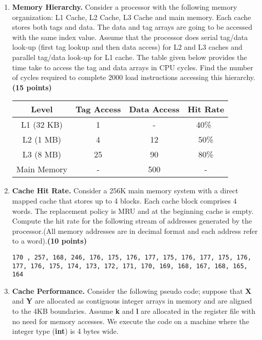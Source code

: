 \documentclass[a4paper, 11pt]{exam}
\begin{document}
\begin{enumerate}
\begin{enumerate}
\end{enumerate}



\item \textbf {Memory Hierarchy.}
Consider a processor with the following memory
organization: L1 Cache, L2 Cache, L3 Cache and main memory. Each cache stores both tags
and data. The data and tag arrays are going to be accessed with the same index value. Assume
that the processor does serial tag/data look-up (first tag lookup and then data access) for L2
and L3 caches and parallel tag/data look-up for L1 cache. The table given below provides the
time take to access the tag and data arrays in CPU cycles. 
Find the number of cycles required to complete 2000 load instructions accessing this
hierarchy.\textbf{(15 points)}

\begin{center}
	\begin{tabular}{ |c|c|c|c| } 
		\hline
		\textbf{Level}& \textbf{Tag Access}& \textbf{Data Access} & \textbf{Hit Rate}\\ 
		\hline
		L1 (32 KB) & 1 & -  & 40\%\ \\ 
		L2 (1 MB) & 4 & 12  & 50\% \\ 
		L3 (8 MB) & 25 & 90  & 80\%\\ 
		\hline
		Main Memory & - & 500  & - \\ 
		\hline
	\end{tabular}
\end{center}



\item \textbf{Cache Hit Rate.}
Consider a 256K main memory system with a direct mapped cache that stores up to 4 blocks. Each cache block comprises 4 words. The replacement policy is MRU and at the beginning cache is empty. Compute the hit rate for the following stream of addresses generated by the processor.(All memory addresses are in decimal format and each address refer to a word).\textbf{(10 points)}

\texttt{170 , 257, 168, 246, 176, 175, 176, 177, 175, 176, 177, 175, 176, 177, 176, 175, 174, 173, 172, 171, 170, 169, 168, 167, 168, 165, 164}



\item \textbf{Cache Performance.}
Consider the following  pseudo code; suppose that \textbf{X} and \textbf{Y} are allocated as contiguous integer arrays in memory and are aligned to the 4KB boundaries.
Assume \textbf{k} and \textbf{l} are allocated in the register file with no need for memory accesses.
We execute the code on a machine where the integer type (\textbf{int}) is 4 bytes wide.


\end{enumerate}
\end{document}
